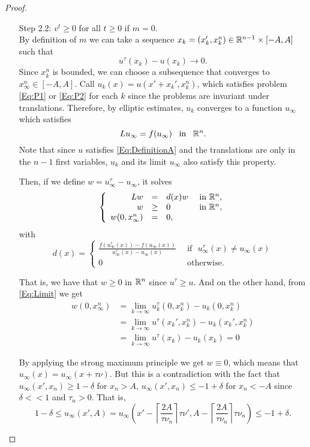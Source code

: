 \begin{proof}
\begin{enumerate}
\item[Step 2.2:] $v^t\geq 0$ for all $t\geq 0$ if $m=0$.\\
By definition of $m$ we can take a sequence $x_k= (x_k',x_k^n) \in \mathbb{R}^{n-1}\times[-A,A]$ such that
\begin{equation}
\label{Eq:Limit}
u^\tau(x_k) - u(x_k) \rightarrow 0.
\end{equation}
Since $x_k^n$ is bounded, we can choose a subsequence that converges to $x_\infty^n \in [-A,A]$.
Call $u_k(x) = u(x'+x_k',x_k^n)$, which satisfies problem \eqref{Eq:P1} or \eqref{Eq:P2} for each $k$ since the problems are invariant under translations. Therefore, by elliptic estimates, $u_k$ converges to a function $u_\infty$ which satisfies
$$ L u_\infty = f(u_\infty) \,\,\, \text{ in } \,\,\, \mathbb{R}^n. $$
Note that since $u$ satisfies \eqref{Eq:DefinitionA} and the translations are only in the $n-1$ first variables, $u_k$ and its limit $u_\infty$ also satisfy this property. 

Then, if we define $w= u_\infty^\tau - u_\infty$, it solves
$$
\left\{\begin{array}{rcll}
L w &=& d(x) w  &\textrm{ in }\mathbb{R}^n,\\
w &\geq& 0  &\textrm{ in }\mathbb{R}^n,\\
w(0, x_\infty^n ) &=& 0,
\end{array} \right.
$$
with 
$$ d(x) = \begin{cases}
\frac{f(u_\infty^\tau(x))-f(u_\infty(x))}{u_\infty^\tau(x)-u_\infty(x)} \,\,\, &\text{if } \,\, u_\infty^\tau(x)\not=u_\infty(x)\\
0 \,\, & \text{otherwise}.
\end{cases} $$


That is, we have that $w\geq 0$ in $\mathbb{R}^n$ since $u^\tau \geq u$. And on the other hand, from \eqref{Eq:Limit} we get
\begin{align*}
w(0,x_\infty^n) &= \lim_{k\to\infty} u_k^\tau(0,x_k^n)- u_k(0,x_k^n) \\ 
&= \lim_{k\to\infty} u^\tau(x_k',x_k^n)- u_k(x_k',x_k^n) \\ 
&= \lim_{k\to\infty}  u^\tau(x_k)- u_k(x_k) = 0
\end{align*}

By applying the strong maximum principle we get $w\equiv 0$, which means that $u_\infty(x) = u_\infty(x+\tau\nu)$. But this is a contradiction with the fact that $u_\infty(x',x_n) \geq 1-\delta$ for $x_n>A$, $u_\infty(x',x_n) \leq -1+\delta$ for $x_n<-A$ since $\delta<<1$ and $\tau_n>0$. That is,
$$ 1-\delta \leq u_\infty(x',A) = u_\infty \left( x' - \left\lceil \frac{2A}{\tau\nu_n} \right\rceil \tau \nu', A - \left\lceil \frac{2A}{\tau\nu_n} \right\rceil \tau \nu_n\right) \leq -1+\delta. $$


\end{enumerate}
\end{proof}
